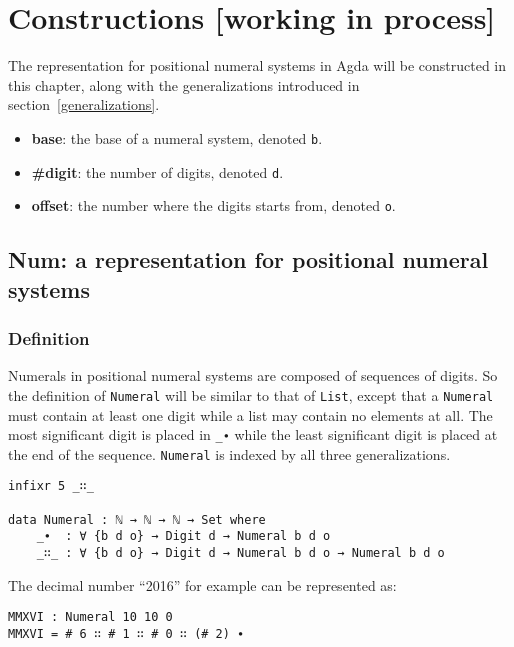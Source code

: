 \documentclass[\main/thesis.tex]{subfiles}
\begin{document}
\chapter{Constructions [working in process]}\label{constructions}

The representation for positional numeral systems in Agda will be constructed in
this chapter, along with the generalizations introduced in section~\ref{generalizations}.

\begin{itemize}
    \item \textbf{base}: the base of a numeral system, denoted {\lstinline|b|}.
    \item \textbf{\#digit}: the number of digits, denoted {\lstinline|d|}.
    \item \textbf{offset}: the number where the digits starts from, denoted {\lstinline|o|}.
\end{itemize}



\section{Num: a representation for positional numeral systems}\label{representation}

\subsection{Definition}

Numerals in positional numeral systems are composed of sequences of digits.
So the definition of {\lstinline|Numeral|} will be similar to that of {\lstinline|List|},
except that a {\lstinline|Numeral|} must contain at least one digit while a list
may contain no elements at all. The most significant digit is placed in {\lstinline|_∙|}
while the least significant digit is placed at the end of the sequence.
{\lstinline|Numeral|} is indexed by all three generalizations.

\begin{lstlisting}
infixr 5 _∷_

data Numeral : ℕ → ℕ → ℕ → Set where
    _∙  : ∀ {b d o} → Digit d → Numeral b d o
    _∷_ : ∀ {b d o} → Digit d → Numeral b d o → Numeral b d o
\end{lstlisting}

The decimal number ``2016'' for example can be represented as:

\begin{lstlisting}
MMXVI : Numeral 10 10 0
MMXVI = # 6 ∷ # 1 ∷ # 0 ∷ (# 2) ∙
\end{lstlisting}
\end{document}
